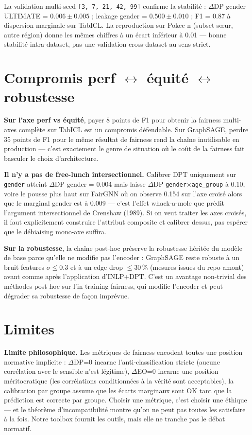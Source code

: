 \documentclass[10pt,a4paper]{article}
\begin{document}
La validation multi-seed \texttt{[3, 7, 21, 42, 99]} confirme la stabilité :
$\Delta$DP gender ULTIMATE = $0.006 \pm 0.005$ ; leakage gender =
$0.500 \pm 0.010$ ; F1 = 0.87 à dispersion marginale sur TabICL. La
reproduction sur Pokec-n (subset sœur, autre région) donne les mêmes
chiffres à un écart inférieur à 0.01 — bonne stabilité intra-dataset,
pas une validation cross-dataset au sens strict.

\section{Compromis perf $\leftrightarrow$ équité $\leftrightarrow$ robustesse}

\textbf{Sur l'axe perf vs équité}, payer 8 points de F1 pour obtenir la
fairness multi-axes complète sur TabICL est un compromis défendable. Sur
GraphSAGE, perdre 35 points de F1 pour le même résultat de fairness rend la
chaîne inutilisable en production — c'est exactement le genre de situation
où le coût de la fairness fait basculer le choix d'architecture.

\textbf{Il n'y a pas de free-lunch intersectionnel.} Calibrer DPT uniquement
sur \texttt{gender} atteint $\Delta$DP gender = 0.004 mais laisse $\Delta$DP
\texttt{gender}$\times$\texttt{age\_group} à 0.10, voire le pousse plus haut
sur FairGNN où on observe 0.154 sur l'axe croisé alors que le marginal
gender est à 0.009 — c'est l'effet whack-a-mole que prédit l'argument
intersectionnel de Crenshaw (1989). Si on veut traiter les axes croisés, il
faut explicitement construire l'attribut composite et calibrer dessus, pas
espérer que le débiaising mono-axe suffira.

\textbf{Sur la robustesse}, la chaîne post-hoc préserve la robustesse
héritée du modèle de base parce qu'elle ne modifie pas l'encoder : GraphSAGE
reste robuste à un bruit features $\sigma \le 0.3$ et à un edge drop
$\le 30$\,\% (mesures issues du repo amont) avant comme après l'application
d'INLP+DPT. C'est un avantage non-trivial des méthodes post-hoc sur
l'in-training fairness, qui modifie l'encoder et peut dégrader sa robustesse
de façon imprévue.

\section{Limites}

\textbf{Limite philosophique.} Les métriques de fairness encodent toutes une
position normative implicite : $\Delta$DP=0 incarne l'anti-classification
stricte (aucune corrélation avec le sensible n'est légitime), $\Delta$EO=0
incarne une position méritocratique (les corrélations conditionnées à la
vérité sont acceptables), la calibration par groupe assume que les écarts
marginaux sont OK tant que la prédiction est correcte par groupe. Choisir
une métrique, c'est choisir une éthique — et le théorème d'incompatibilité
montre qu'on ne peut pas toutes les satisfaire à la fois. Notre toolbox
fournit les outils, mais elle ne tranche pas le débat normatif.
\end{document}
